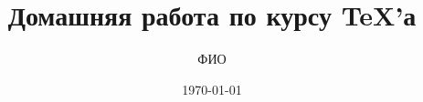 \documentclass{article}
\title{\bfseries Домашняя работа \textnumero 7 по курсу \TeX'а}
\author{ФИО}
\date{\today}
\begin{document}

\pagebreak





\end{document}
